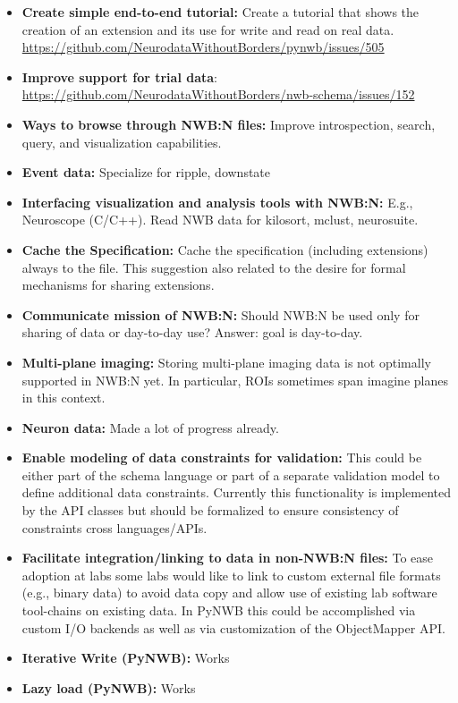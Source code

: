 \documentclass{article}
\begin{document}
\begin{itemize}
 \setlength\itemsep{0cm}
 \item \textbf{Create simple end-to-end tutorial:} Create a tutorial that shows the creation of an 
      extension and its use for write and read on real data. {\footnotesize \href{https://github.com/NeurodataWithoutBorders/pynwb/issues/505}{https://github.com/NeurodataWithoutBorders/pynwb/issues/505}}
 \item \textbf{Improve support for trial data}: {\footnotesize  \href{https://github.com/NeurodataWithoutBorders/nwb-schema/issues/152}{https://github.com/NeurodataWithoutBorders/nwb-schema/issues/152}}
 \item \textbf{Ways to browse through NWB:N files:} Improve introspection, search, query, and visualization capabilities.
 \item \textbf{Event data:} Specialize for ripple, downstate
 \item \textbf{Interfacing visualization and analysis tools with NWB:N:} E.g., Neuroscope (C/C++). Read NWB data
      for kilosort, mclust, neurosuite.
 \item \textbf{Cache the Specification:} Cache the specification (including extensions) always to the file. This
      suggestion also related to the desire for formal mechanisms for sharing extensions. 
 \item \textbf{Communicate mission of NWB:N:} Should NWB:N be used only for sharing of data 
        or day-to-day use? Answer: goal is day-to-day.
 \item \textbf{Multi-plane imaging:} Storing multi-plane imaging data is not optimally supported in NWB:N yet. In
        particular, ROIs sometimes span imagine planes in this context. 
 \item \textbf{Neuron data:} Made a lot of progress already. 
 \item \textbf{Enable modeling of data constraints for validation:} This could be either part of the schema
       language or part of a separate validation model to define additional data constraints. Currently this
       functionality is implemented by the API classes but should be formalized to ensure consistency of
       constraints cross languages/APIs.
 \item \textbf{Facilitate integration/linking to data in non-NWB:N files:} To ease adoption at labs some
       labs would like to link to custom external file formats (e.g., binary data) to avoid data copy and
       allow use of existing lab software tool-chains on existing data. In PyNWB this could be accomplished
       via custom I/O backends as well as via customization of the ObjectMapper API.
 \item \textbf{Iterative Write (PyNWB):} Works
 \item \textbf{Lazy load (PyNWB):} Works 
\end{itemize}
\end{document}
